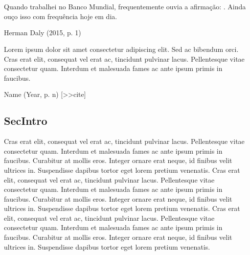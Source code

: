 \documentclass[./main.tex]{subfiles}
\begin{document}
\chapter{\chapEco} \label{chap:ecoeco}

\setlength{\parskip}{0mm}

\epigraph{\small{Quando trabalhei no Banco Mundial, frequentemente ouvia a afirmação: . Ainda ouço isso com frequência hoje em dia.}}{Herman Daly (2015, p. 1) \cite{Daly2015a}}

\epigraph{\small{Lorem ipsum dolor sit amet consectetur adipiscing elit. Sed ac bibendum orci. Cras erat elit, consequat vel erat ac, tincidunt pulvinar lacus. Pellentesque vitae consectetur quam. Interdum et malesuada fames ac ante ipsum primis in faucibus.}}{Name (Year, p. n) [>>cite]}

\setlength{\parskip}{\myparskip}

\section{SecIntro} \label{chap:ecoeco:sec1}

\par Cras erat elit, consequat vel erat ac, tincidunt pulvinar lacus. Pellentesque vitae consectetur quam. Interdum et malesuada fames ac ante ipsum primis in faucibus. Curabitur at mollis eros. Integer ornare erat neque, id finibus velit ultrices in. Suspendisse dapibus tortor eget lorem pretium venenatis. Cras erat elit, consequat vel erat ac, tincidunt pulvinar lacus. Pellentesque vitae consectetur quam. Interdum et malesuada fames ac ante ipsum primis in faucibus. Curabitur at mollis eros. Integer ornare erat neque, id finibus velit ultrices in. Suspendisse dapibus tortor eget lorem pretium venenatis. Cras erat elit, consequat vel erat ac, tincidunt pulvinar lacus. Pellentesque vitae consectetur quam. Interdum et malesuada fames ac ante ipsum primis in faucibus. Curabitur at mollis eros. Integer ornare erat neque, id finibus velit ultrices in. Suspendisse dapibus tortor eget lorem pretium venenatis.
\end{document}
